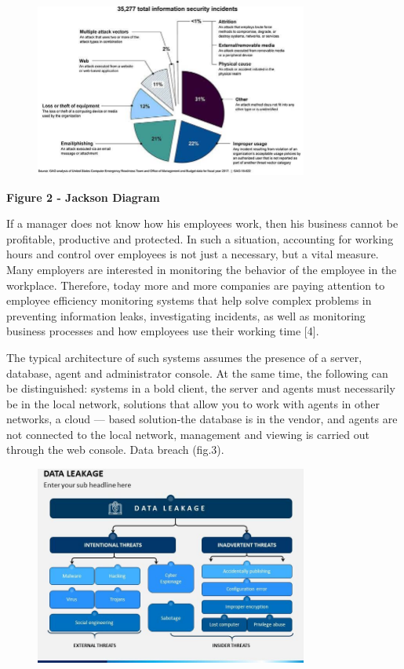 \begin{figure}[H]
	\centering
	\includegraphics[width=0.8\textwidth]{assets/64}
	\caption*{}
\end{figure}

\textbf{Figure 2 - Jackson Diagram}

If a manager does not know how his employees work, then his business
cannot be profitable, productive and protected. In such a situation,
accounting for working hours and control over employees is not just a
necessary, but a vital measure. Many employers are interested in
monitoring the behavior of the employee in the workplace. Therefore,
today more and more companies are paying attention to employee
efficiency monitoring systems that help solve complex problems in
preventing information leaks, investigating incidents, as well as
monitoring business processes and how employees use their working time
{[}4{]}.

The typical architecture of such systems assumes the presence of a
server, database, agent and administrator console. At the same time, the
following can be distinguished: systems in a bold client, the server and
agents must necessarily be in the local network, solutions that allow
you to work with agents in other networks, a cloud --- based
solution-the database is in the vendor, and agents are not connected to
the local network, management and viewing is carried out through the web
console. Data breach (fig.3).

\begin{figure}[H]
	\centering
	\includegraphics[width=0.8\textwidth]{assets/65}
	\caption*{}
\end{figure}

